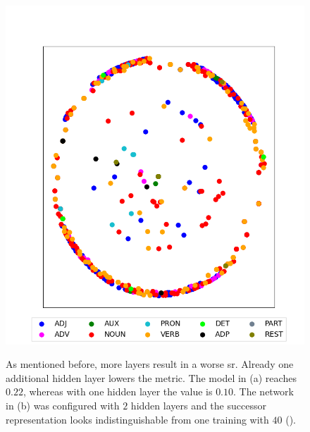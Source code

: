 \begin{figure}[H]
{		\includegraphics[height=\hh]{Bilder/chapter4/additional_configurations/OHE_OHE_4000E_100BS_2L_1C_200P_1500T_J/MDS_of_Transition_Probability_Matrix;_t=1,_DF=0.5.png}
	}
	\caption{As mentioned before, more layers result in a worse \gls{sr}. Already one additional hidden layer lowers the metric. The model in (a) reaches $ 0.22 $, whereas with one hidden layer the value is $ 0.10 $. The network in (b) was configured with $ 2 $ hidden layers and the successor representation looks indistinguishable from one training with $ 40 $ (\figref{\ref{fig: text model en ohe 40L}}).}
\end{figure}


\clearpage

